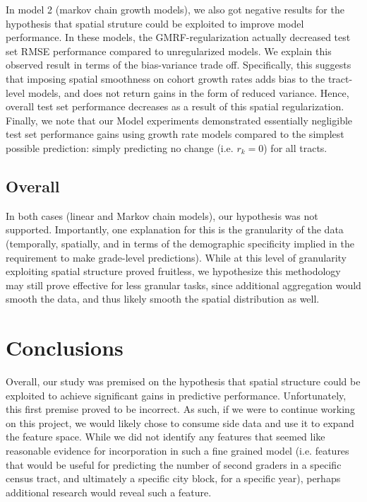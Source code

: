 \documentclass[journal]{IEEEtran}
\begin{document}
In model 2 (markov chain growth models), we also got negative results for the hypothesis that spatial struture could be exploited to improve model performance. In these models, the GMRF-regularization actually decreased test set RMSE performance compared to unregularized models. We explain this observed result in terms of the bias-variance trade off. Specifically, this suggests that imposing spatial smoothness on cohort growth rates adds bias to the tract-level models, and does not return gains in the form of reduced variance. Hence, overall test set performance decreases as a result of this spatial regularization. Finally, we note that our Model experiments demonstrated essentially negligible test set performance gains using growth rate models compared to the simplest possible prediction: simply predicting no change (i.e. $r_k = 0$) for all tracts.

\subsection{Overall}

In both cases (linear and Markov chain models), our hypothesis was not supported. Importantly, one explanation for this is the granularity of the data (temporally, spatially, and in terms of the demographic specificity implied in the requirement to make grade-level predictions). While at this level of granularity exploiting spatial structure proved fruitless, we hypothesize this methodology may still prove effective for less granular tasks, since additional aggregation would smooth the data, and thus likely smooth the spatial distribution as well.

\section{Conclusions}

Overall, our study was premised on the hypothesis that spatial structure could be exploited to achieve significant gains in predictive performance. Unfortunately, this first premise proved to be incorrect. As such, if we were to continue working on this project, we would likely chose to consume side data and use it to expand the feature space. While we did not identify any features that seemed like reasonable evidence for incorporation in such a fine grained model (i.e. features that would be useful for predicting the number of second graders in a specific census tract, and ultimately a specific city block, for a specific year), perhaps additional research would reveal such a feature.
\end{document}
